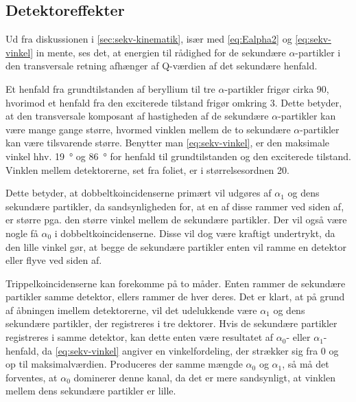 \subsection{Detektoreffekter}
\label{sec:detektor-effekter}

Ud fra diskussionen i \cref{sec:sekv-kinematik}, især med \cref{eq:Ealpha2} og \cref{eq:sekv-vinkel}
in mente, ses det, at energien til rådighed for de sekundære $\alpha$-partikler i den transversale retning
afhænger af Q-værdien af det sekundære henfald.

Et henfald fra grundtilstanden af beryllium til tre $\alpha$-partikler frigør cirka 90\keV, hvorimod et
henfald fra den exciterede tilstand frigør omkring 3\MeV. Dette betyder, at den transversale
komposant af hastigheden af de sekundære $\alpha$-partikler kan være mange gange større, hvormed vinklen
mellem de to sekundære $\alpha$-partikler kan være tilsvarende større. Benytter man
\cref{eq:sekv-vinkel}, er den maksimale vinkel hhv. \SI{19}{\degree} og \SI{86}{\degree} for
henfald til grundtilstanden og den exciterede tilstand. Vinklen mellem detektorerne, set fra
foliet, er i størrelsesordnen 20\degree.

Dette betyder, at dobbeltkoincidenserne primært vil udgøres af $\alpha_{1}$ og dens sekundære partikler,
da sandsynligheden for, at en af disse rammer ved siden af, er større pga. den større vinkel mellem
de sekundære partikler. Der vil også være nogle få $\alpha_{0}$ i dobbeltkoincidenserne. Disse vil dog
være kraftigt undertrykt, da den lille vinkel gør, at begge de sekundære partikler enten vil ramme
en detektor eller flyve ved siden af.

Trippelkoincidenserne kan forekomme på to måder. Enten rammer de sekundære partikler samme
detektor, ellers rammer de hver deres. Det er klart, at på grund af åbningen imellem detektorerne,
vil det udelukkende være $\alpha_{1}$ og dens sekundære partikler, der registreres i tre
dektorer. Hvis de sekundære partikler registreres i samme detektor, kan dette enten være
resultatet af $\alpha_{0}$- eller $\alpha_{1}$-henfald, da \cref{eq:sekv-vinkel} angiver en vinkelfordeling,
der strækker sig fra 0 og op til maksimalværdien. Produceres der samme mængde $\alpha_{0}$ og
$\alpha_{1}$, så må det forventes, at $\alpha_{0}$ dominerer denne kanal, da det er mere sandsynligt, at
vinklen mellem dens sekundære partikler er lille.



